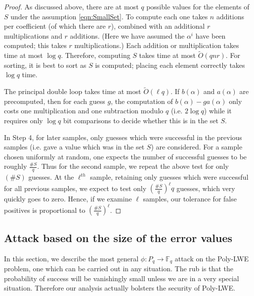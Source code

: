 \documentclass{llncs}
\newcommand{\FF}{\mathbb{F}}
\newcommand{\<}{\langle}
\renewcommand{\>}{\rangle}
\begin{document}
\begin{proof}
        As discussed above, there are at most $q$ possible values for the elements of $S$ under the assumption \eqref{eqn:SmallSet}.  To compute each one takes $n$ additions per coefficient (of which there are $r$), combined with an additional $r$ multiplications and $r$ additions.  (Here we have assumed the $\alpha^i$ have been computed; this takes $r$ multiplications.)  Each addition or multiplication takes time at most $\log q$.  Therefore, computing $S$ takes time at most $\widetilde{O}(qnr)$.  For sorting, it is best to sort as $S$ is computed; placing each element correctly takes $\log q$ time.

The principal double loop takes time at most $\widetilde{O}(\ell q)$. If $b(\alpha)$ and $a(\alpha)$ are precomputed, then for each guess $g$, the computation of $b(\alpha)- g a(\alpha)$ only costs one multiplication and one subtraction modulo $q$ (i.e. $2\log q$) while it requires only $\log q$ bit comparisons to decide whether this is in the set $S$.

In Step 4, for later samples, only guesses which were successful in the previous samples (i.e. gave a value which was in the set $S$) are considered. For a sample chosen uniformly at random, one expects the number of successful guesses to be roughly $\frac{\#S}{q}$.  Thus for the second sample, we repeat the above test for only $(\#S)$ guesses.  At the $\ell^{th}$ sample, retaining only guesses which were successful for all previous samples, we expect to test only  $(\frac{\#S}{q})^\ell q$ guesses, which very quickly goes to zero.  Hence, if we examine $\ell$ samples, our tolerance for false positives is proportional to $(\frac{\#S}{q})^\ell$.

\end{proof}

\subsection{Attack based on the size of the error values}
\label{sec:SmallError}

In this section, we describe the most general $\phi: P_q \rightarrow \FF_q$ attack on the Poly-LWE problem, one which can be carried out in any situation.  The rub is that the probability of success will be vanishingly small unless we are in a very special situation.  Therefore our analysis actually bolsters the security of Poly-LWE.
\end{document}
